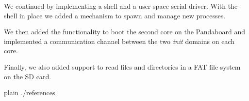 \documentclass[a4paper,10pt]{article}
\begin{document}
We continued by implementing a shell and a user-space serial driver.
With the shell in place we added a mechanism to spawn and manage new processes.

We then added the functionality to boot the second core on the Pandaboard and implemented a communication channel between the two \emph{init} domains on each core.

Finally, we also added support to read files and directories in a FAT file system on the SD card.

\begin{flushleft}
{{{
 {plain}
 {./references}
}}}
\end{flushleft}


\end{document}
